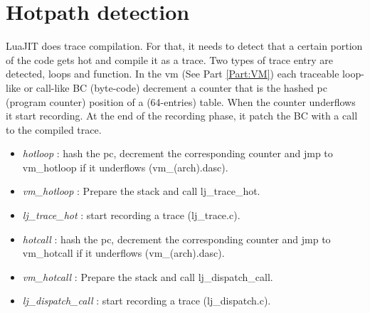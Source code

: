\section{Hotpath detection}
\label{Sec:Hotpath}
LuaJIT does trace compilation. For that, it needs to detect that a certain
portion of the code gets hot and compile it as a trace. Two types of trace entry
are detected, loops and function. In the vm (See Part \ref{Part:VM}) each
traceable loop-like or call-like BC (byte-code) decrement a counter that is the
hashed pc (program counter) position of a (64-entries) table. When the counter underflows it start recording. At the end of the recording phase, it patch the
BC with a call to the compiled trace.


\begin{itemize}
	\item \emph{hotloop} : hash the pc, decrement the corresponding counter and
jmp to vm\_hotloop if it underflows (vm\_(arch).dasc).
	\item \emph{vm\_hotloop} : Prepare the stack and call lj\_trace\_hot.
	\item \emph{lj\_trace\_hot} : start recording a trace (lj\_trace.c).
\end{itemize}


\begin{itemize}
	\item \emph{hotcall} : hash the pc, decrement the corresponding counter and
jmp to vm\_hotcall if it underflows (vm\_(arch).dasc).
	\item \emph{vm\_hotcall} : Prepare the stack and call lj\_dispatch\_call.
	\item \emph{lj\_dispatch\_call} : start recording a trace (lj\_dispatch.c).
\end{itemize}